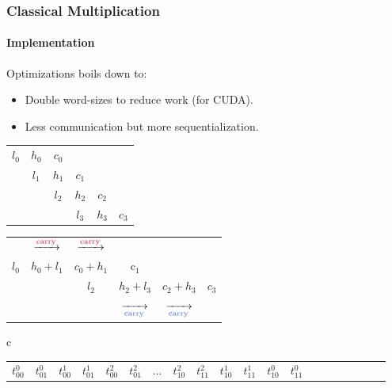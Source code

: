 \begin{frame}[fragile]
  \frametitle{Classical Multiplication}
  \framesubtitle{Implementation}
  Optimizations boils down to:
  \begin{itemize}
  \item Double word-sizes to reduce work (for CUDA).\pause
  \item Less communication but more sequentialization.
  \end{itemize}\pause
  \begin{center}
  \tiny
  \begin{tabular}{cccccc}
    \color{Crimson}$l_0$ & \color{Crimson}$h_0$ & \color{Crimson}$c_0$ & & & \\
    & \color{Crimson}$l_1$ & \color{Crimson}$h_1$ & \color{Crimson}$c_1$ & & \\
    & & \color{RoyalBlue}$l_2$ & \color{RoyalBlue}$h_2$ & \color{RoyalBlue}$c_2$ & \\
    & & & \color{RoyalBlue}$l_3$ & \color{RoyalBlue}$h_3$ & \color{RoyalBlue}$c_3$
  \end{tabular}
\begin{tabular}{cccccc}
     & $\xrightarrow{\scriptsize \text{\color{Crimson}carry}}$ & $\xrightarrow{\scriptsize \text{\color{Crimson}carry}}$ &  &  &  \\
    \color{Crimson}$l_0$ & \color{Crimson}$h_0 + l_1$ & \color{Crimson}$c_0 + h_1$ & \color{Crimson}c$_1$ & & \\
    & & \color{RoyalBlue}$l_2$ & \color{RoyalBlue}$h_2+l_3$ & \color{RoyalBlue}$c_2+h_3$ & \color{RoyalBlue} $c_3$\\
  & & & $\xrightarrow[\scriptsize \text{\color{RoyalBlue}carry}]{}$ & $\xrightarrow[\scriptsize \text{\color{RoyalBlue}carry}]{}$ & \\
\end{tabular}
\end{center}\pause
  \begin{center}
  \tiny
  \begin{tabular}{c}
    \begin{tabular}{|C{0.3cm}|C{0.3cm}|C{0.3cm}|C{0.3cm}|C{0.3cm}|C{0.3cm}|C{0.3cm}|C{0.3cm}|C{0.3cm}|C{0.3cm}|C{0.3cm}|C{0.3cm}|C{0.3cm}|C{0.43cm}|C{0.3cm}|C{0.3cm}|C{0.3cm}|C{0.3cm}|C{0.3cm}|C{0.3cm}|}
      \hline
      \color{Crimson}$t^0_{00}$ & \color{Crimson}$t^0_{01}$ & \color{RoyalBlue}$t^1_{00}$ & \color{RoyalBlue}$t^1_{01}$  & \color{ForestGreen}$t^2_{00}$ & \color{ForestGreen}$t^2_{01}$  & $\ldots$ & \color{ForestGreen}$t^2_{10}$ & \color{ForestGreen}$t^2_{11}$  & \color{RoyalBlue}$t^1_{10}$ & \color{RoyalBlue}$t^1_{11}$ & \color{Crimson}$t^0_{10}$ & \color{Crimson}$t^0_{11}$ \\

\end{tabular}
\end{tabular}
\end{center}
\end{frame}
